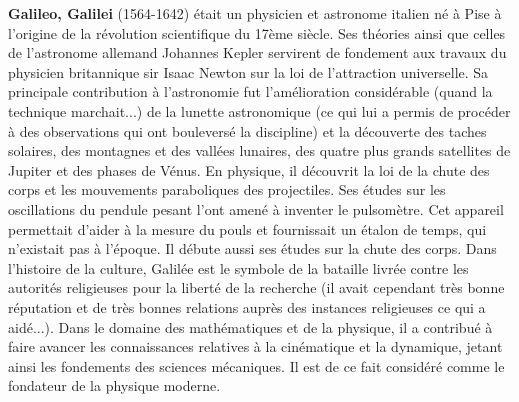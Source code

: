 {}
\label{sec:G}

\textbf{Galileo, Galilei} (1564-1642) était un physicien et astronome italien né à Pise à l'origine de la révolution scientifique du 17ème siècle. Ses théories ainsi que celles de l'astronome allemand Johannes Kepler servirent de fondement aux travaux du physicien britannique sir Isaac Newton sur la loi de l'attraction universelle. Sa principale contribution à l'astronomie fut l'amélioration considérable (quand la technique marchait...) de la lunette astronomique (ce qui lui a permis de procéder à des observations qui ont bouleversé la discipline) et la découverte des taches solaires, des montagnes et des vallées lunaires, des quatre plus grands satellites de Jupiter et des phases de Vénus. En physique, il découvrit la loi de la chute des corps et les mouvements paraboliques des projectiles. Ses études sur les oscillations du pendule pesant l'ont amené à inventer le pulsomètre. Cet appareil permettait d'aider à la mesure du pouls et fournissait un étalon de temps, qui n'existait pas à l'époque. Il débute aussi ses études sur la chute des corps. Dans l'histoire de la culture, Galilée est le symbole de la bataille livrée contre les autorités religieuses pour la liberté de la recherche (il avait cependant très bonne réputation et de très bonnes relations auprès des instances religieuses ce qui a aidé...). Dans le domaine des mathématiques et de la physique, il a contribué à faire avancer les connaissances relatives à la cinématique et la dynamique, jetant ainsi les fondements des sciences mécaniques. Il est de ce fait considéré comme le fondateur de la physique moderne.

